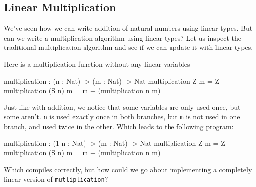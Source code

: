 \documentclass[
]{article}
\newenvironment{Shaded}{}{}
\newcommand{\DataTypeTok}[1]{\textcolor[rgb]{0.56,0.13,0.00}{#1}}
\newcommand{\DecValTok}[1]{\textcolor[rgb]{0.25,0.63,0.44}{#1}}
\newcommand{\NormalTok}[1]{#1}
\newcommand{\OperatorTok}[1]{\textcolor[rgb]{0.40,0.40,0.40}{#1}}
\newcommand{\OtherTok}[1]{\textcolor[rgb]{0.00,0.44,0.13}{#1}}
\begin{document}
\hypertarget{linear-multiplication}{%
\subsection{Linear Multiplication}\label{linear-multiplication}}

We've seen how we can write addition of natural numbers using linear
types. But can we write a multiplication algorithm using linear types?
Let us inspect the traditional multiplication algorithm and see if we
can update it with linear types.

Here is a multiplication function without any linear variables

\begin{Shaded}
\begin{Highlighting}[]
\NormalTok{multiplication }\OperatorTok{:}\NormalTok{ (n }\OperatorTok{:} \DataTypeTok{Nat}\NormalTok{) }\OtherTok{{-}\textgreater{}}\NormalTok{ (m }\OperatorTok{:} \DataTypeTok{Nat}\NormalTok{) }\OtherTok{{-}\textgreater{}} \DataTypeTok{Nat}
\NormalTok{multiplication }\DataTypeTok{Z}\NormalTok{ m }\OtherTok{=} \DataTypeTok{Z} 
\NormalTok{multiplication (}\DataTypeTok{S}\NormalTok{ n) m }\OtherTok{=}\NormalTok{ m }\OperatorTok{+}\NormalTok{ (multiplication n m)}
\end{Highlighting}
\end{Shaded}

Just like with addition, we notice that some variables are only used
once, but some aren't. \texttt{n} is used exactly once in both branches,
but \texttt{m} is not used in one branch, and used twice in the other.
Which leads to the following program:

\begin{Shaded}
\begin{Highlighting}[]
\NormalTok{ multiplication }\OperatorTok{:}\NormalTok{ (}\DecValTok{1}\NormalTok{ n }\OperatorTok{:} \DataTypeTok{Nat}\NormalTok{) }\OtherTok{{-}\textgreater{}}\NormalTok{ (m }\OperatorTok{:} \DataTypeTok{Nat}\NormalTok{) }\OtherTok{{-}\textgreater{}} \DataTypeTok{Nat}
\NormalTok{ multiplication }\DataTypeTok{Z}\NormalTok{ m }\OtherTok{=} \DataTypeTok{Z}
\NormalTok{ multiplication (}\DataTypeTok{S}\NormalTok{ n) m }\OtherTok{=}\NormalTok{ m }\OperatorTok{+}\NormalTok{ (multiplication n m)}
\end{Highlighting}
\end{Shaded}

Which compiles correctly, but how could we go about implementing a
completely linear version of \texttt{mutliplication}?
\end{document}
